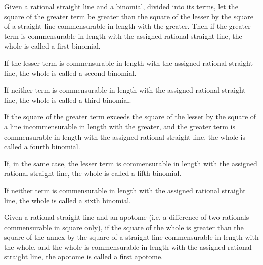 
\begin{scope}
\label{def:X.II.1}
Given a rational straight line and a binomial, divided into its terms,
let the square of the greater term be greater than the square of the
lesser by the square of a straight line commensurable in length with
the greater. Then if the greater term is commensurable in length with
the assigned rational straight line, the whole is called a first binomial.
\end{scope}

\begin{scope}
\label{def:X.II.2}
If the lesser term is commensurable in length with the assigned
rational straight line, the whole is called a second binomial.
\end{scope}

\begin{scope}
\label{def:X.II.3}
If neither term is commensurable in length with the assigned rational
straight line, the whole is called a third binomial.
\end{scope}

\begin{scope}
\label{def:X.II.4}
If the square of the greater term exceeds the square of the lesser by
the square of a line incommensurable in length with the greater, and
the greater term is commensurable in length with the assigned
rational straight line, the whole is called a fourth binomial.
\end{scope}

\begin{scope}
\label{def:X.II.5}
If, in the same case, the lesser term is commensurable in length with
the assigned rational straight line, the whole is called a fifth
binomial.
\end{scope}

\begin{scope}
\label{def:X.II.6}
If neither term is commensurable in length with the assigned rational
straight line, the whole is called a sixth binomial.
\end{scope}


\begin{scope}
\label{def:X.III.1}
Given a rational straight line and an apotome (i.e. a difference of
two rationals commensurable in square only), if the square of the
whole is greater than the square of the annex by the square of a
straight line commensurable in length with the whole, and the whole
is commensurable in length with the assigned rational straight line,
the apotome is called a first apotome.
\end{scope}


